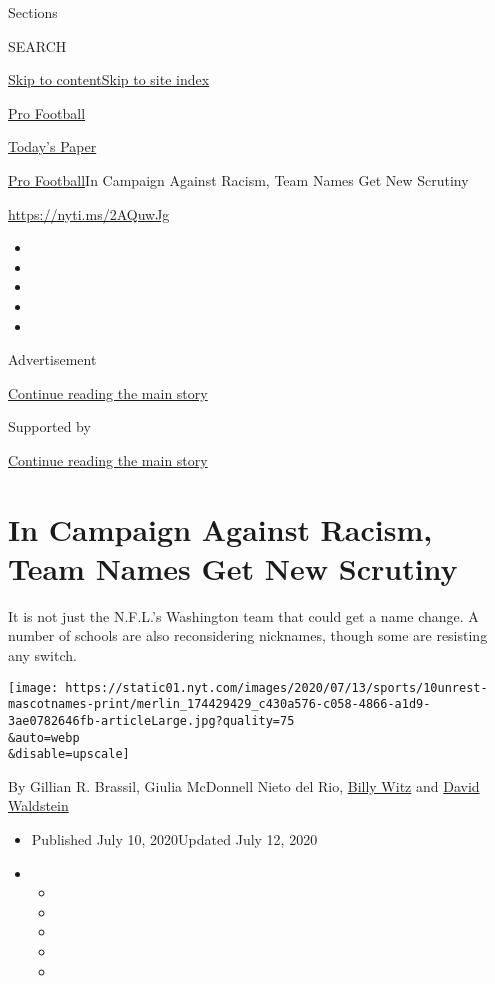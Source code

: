 Sections

SEARCH

\protect\hyperlink{site-content}{Skip to
content}\protect\hyperlink{site-index}{Skip to site index}

\href{https://www.nytimes.com/section/sports/football}{Pro Football}

\href{https://myaccount.nytimes.com/auth/login?response_type=cookie\&client_id=vi}{}

\href{https://www.nytimes.com/section/todayspaper}{Today's Paper}

\href{/section/sports/football}{Pro Football}\textbar{}In Campaign
Against Racism, Team Names Get New Scrutiny

\url{https://nyti.ms/2AQuwJg}

\begin{itemize}
\item
\item
\item
\item
\item
\end{itemize}

Advertisement

\protect\hyperlink{after-top}{Continue reading the main story}

Supported by

\protect\hyperlink{after-sponsor}{Continue reading the main story}

\hypertarget{in-campaign-against-racism-team-names-get-new-scrutiny}{%
\section{In Campaign Against Racism, Team Names Get New
Scrutiny}\label{in-campaign-against-racism-team-names-get-new-scrutiny}}

It is not just the N.F.L.'s Washington team that could get a name
change. A number of schools are also reconsidering nicknames, though
some are resisting any switch.

\texttt{[image: https://static01.nyt.com/images/2020/07/13/sports/10unrest-mascotnames-print/merlin\_174429429\_c430a576-c058-4866-a1d9-3ae0782646fb-articleLarge.jpg?quality=75\\\&auto=webp\\\&disable=upscale]}

By Gillian R. Brassil, Giulia McDonnell Nieto del Rio,
\href{https://www.nytimes.com/by/billy-witz}{Billy Witz} and
\href{https://www.nytimes.com/by/david-waldstein}{David Waldstein}

\begin{itemize}
\item
  Published July 10, 2020Updated July 12, 2020
\item
  \begin{itemize}
  \item
  \item
  \item
  \item
  \item
  \end{itemize}
\end{itemize}

